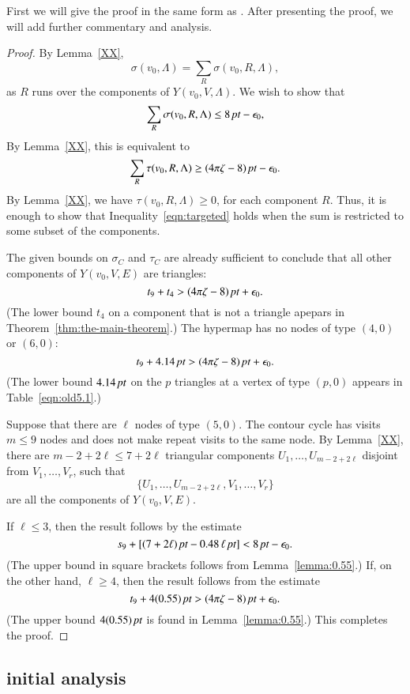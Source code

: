 First we will give the proof in the same form as \cite{DCG}.
After presenting the proof, we will add further commentary and analysis.


\begin{proof}  
By Lemma~\ref{XX},
  $$
  \sigma(v_0,\Lambda) = \sum_{R}\sigma(v_0,R,\Lambda),
  $$
as $R$ runs over the components of $Y(v_0,V,\Lambda)$.
We wish to show that
  $$
  \sum_{R}\sigma(v_0,R,\Lambda)\le 8\,\hbox{\it pt} -\epsilon_0,
  $$
By Lemma~\ref{XX}, this is equivalent to
  \begin{equation}
  \sum_{R} \tau(v_0,R,\Lambda)\ge (4\pi\zeta-8)\,\hbox{\it pt}-\epsilon_0.
  \label{eqn:targeted}
  \end{equation}
By Lemma~\ref{XX}, we have $\tau(v_0,R,\Lambda)\ge0$, for
each component $R$.  Thus, it is enough to show that
Inequality~\ref{eqn:targeted} holds when the sum is restricted
to some subset of the components.

The given bounds on $\sigma_C$ and $\tau_C$ are
already sufficient to conclude that all other components of
$Y(v_0,V,E)$ are triangles:
   $$
   t_9 + t_4 > (4\pi\zeta -8)\,\hbox{\it pt} + \epsilon_0.
   $$
(The lower bound $t_4$ on a component that is not a triangle apepars
in Theorem~\ref{thm:the-main-theorem}.)
The hypermap has no nodes of type $(4,0)$ or $(6,0)$:
$$
   t_9 + 4.14\,\hbox{\it pt} > (4\pi\zeta-8)\,\hbox{\it pt} + \epsilon_0.
$$
(The lower bound $4.14\,\hbox{\it pt}$ on the $p$ triangles at a vertex
of type $(p,0)$ appears in Table~\ref{eqn:old5.1}.)

Suppose that there are $\ell$ nodes of type $(5,0)$.  The
contour cycle has visits  $m\le 9$ nodes and does
not make repeat visits to the same node.  By Lemma~\ref{XX}, 
there are $m-2 + 2\ell\le 7+2\ell$ 
triangular components $U_1,\ldots,U_{m-2+2\ell}$
disjoint from $V_1,\ldots,V_r$, such that
   $$
   \{U_1,\ldots,U_{m-2+2\ell},V_1,\ldots,V_r\}
   $$
are all the components of $Y(v_0,V,E)$.

If $\ell\le 3$, then the result follows by the estimate
   $$
   s_9 + [(7+2\ell)\,\hbox{\it pt} - 0.48\,\ell\,\hbox{\it pt}] < 8\,\hbox{\it pt} - \epsilon_0.
   $$
(The upper bound in square brackets follows from Lemma~\ref{lemma:0.55}.)
If, on the other hand, $\ell\ge 4$, then the result follows from
the estimate
   $$
   t_9 + 4 (0.55)\,\hbox{\it pt} > (4\pi\zeta -8)\,\hbox{\it pt} + \epsilon_0.
   $$
(The upper bound $4(0.55)\,\hbox{\it pt}$ is found in Lemma~\ref{lemma:0.55}.)
This completes the proof.
\end{proof}

\subsection{initial analysis}

